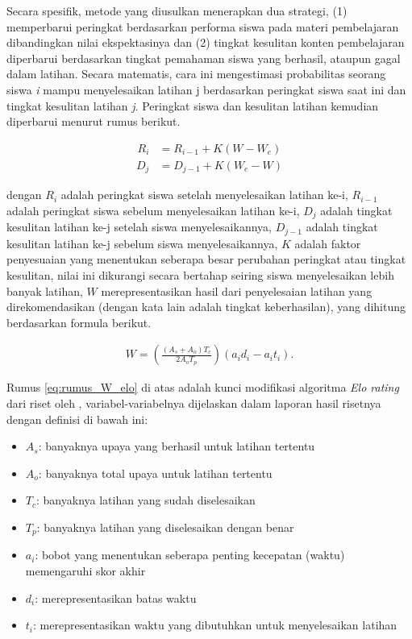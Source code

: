 Secara spesifik, metode yang diusulkan menerapkan dua strategi, (1) memperbarui peringkat
berdasarkan performa siswa pada materi pembelajaran dibandingkan nilai ekspektasinya dan (2)
tingkat kesulitan konten pembelajaran diperbarui berdasarkan tingkat pemahaman siswa yang berhasil,
ataupun gagal dalam latihan. Secara matematis, cara ini mengestimasi probabilitas seorang siswa \textit{i} mampu
menyelesaikan latihan j berdasarkan peringkat siswa saat ini dan tingkat kesulitan latihan \textit{j}.
Peringkat siswa dan kesulitan latihan kemudian diperbarui menurut rumus berikut.

\begin{align}
R_i &= R_{i-1} + K (W - W_e)\label{eq:rumus_elo_student}
\end{align}
\begin{align}
D_j &= D_{j-1} + K (W_e - W)\label{eq:rumus_elo_latihan}
\end{align}

dengan $R_i$ adalah peringkat siswa setelah menyelesaikan latihan ke-i,
$R_{i-1}$ adalah peringkat siswa sebelum menyelesaikan latihan ke-i,
$D_j$ adalah tingkat kesulitan latihan ke-j setelah siswa menyelesaikannya,
$D_{j-1}$ adalah tingkat kesulitan latihan ke-j sebelum siswa menyelesaikannya,
$K$ adalah faktor penyesuaian yang menentukan seberapa besar perubahan peringkat
atau tingkat kesulitan, nilai ini dikurangi secara bertahap seiring siswa menyelesaikan lebih banyak latihan,
$W$ merepresentasikan hasil dari penyelesaian latihan yang direkomendasikan (dengan kata lain adalah tingkat keberhasilan),
yang dihitung berdasarkan formula berikut.

\begin{align}
W = \left(\frac{(A_s + A_o)T_c}{2A_oT_p}\right)(a_id_i - a_it_i). \label{eq:rumus_W_elo}
\end{align}

Rumus \ref{eq:rumus_W_elo} di atas adalah kunci modifikasi algoritma \textit{Elo rating} dari riset oleh \textcite{Vesin2022},
variabel-variabelnya dijelaskan dalam laporan hasil risetnya dengan definisi di bawah ini:
\begin{itemize}
    \item $A_s$: banyaknya upaya yang berhasil untuk latihan tertentu
    \item $A_o$: banyaknya total upaya untuk latihan tertentu
    \item $T_c$: banyaknya latihan yang sudah diselesaikan
    \item $T_p$: banyaknya latihan yang diselesaikan dengan benar
    \item $a_i$: bobot yang menentukan seberapa penting kecepatan (waktu) memengaruhi skor akhir
    \item $d_i$: merepresentasikan batas waktu
    \item $t_i$: merepresentasikan waktu yang dibutuhkan untuk menyelesaikan latihan
\end{itemize}

